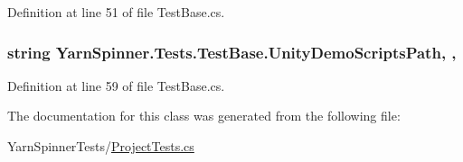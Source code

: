 Definition at line 51 of file Test\-Base.\-cs.

\hypertarget{a00152_a39922286f6255e4fd0e433a4fc7521c4}{
\subsubsection[{Unity\-Demo\-Scripts\-Path}]{\setlength{\rightskip}{0pt plus 5cm}string Yarn\-Spinner.\-Tests.\-Test\-Base.\-Unity\-Demo\-Scripts\-Path\hspace{0.3cm}{\ttfamily [static]}, {\ttfamily [get]}, {\ttfamily [inherited]}}}\label{a00152_a39922286f6255e4fd0e433a4fc7521c4}


Definition at line 59 of file Test\-Base.\-cs.



The documentation for this class was generated from the following file\-:\begin{DoxyCompactItemize}
\item 
Yarn\-Spinner\-Tests/\hyperlink{a00304}{Project\-Tests.\-cs}\end{DoxyCompactItemize}
